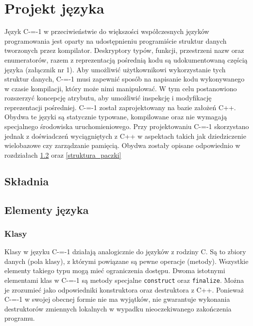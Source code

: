 \section{Projekt języka}
\label{Language_desig}
Język C-=-1 w przeciwieństwie do większości współczesnych języków programowania jest oparty na udostępnieniu programiście struktur danych tworzonych przez kompilator. Deskryptory typów, funkcji, przestrzeni nazw oraz enumeratorów, razem z reprezentacją pośrednią kodu są udokumentowaną częścią języka (załącznik nr 1).
Aby umożliwić użytkownikowi wykorzystanie tych struktur danych, C-=-1 musi zapewnić sposób na napisanie kodu wykonywanego w czasie kompilacji, który może nimi manipulować. W tym celu postanowiono rozszerzyć koncepcję atrybutu, aby umożliwić inspekcję i modyfikację reprezentacji pośredniej.
C-=-1 został zaprojektowany na bazie założeń C++. Obydwa te języki są statycznie typowane, kompilowane oraz nie wymagają specjalnego środowiska uruchomieniowego.
Przy projektowaniu C-=-1 skorzystano jednak z doświadczeń wyciągniętych z C++ w aspektach takich jak dziedziczenie wielobazowe czy zarządzanie pamięcią. Obydwa zostały opisane odpowiednio w rozdziałach \ref{elementy_jezyka} oraz \ref{struktura_paczki}

\subsection{Składnia}

\subsection{Elementy języka}
\label{elementy_jezyka}

\subsubsection{Klasy}
\label{classes_definition}
Klasy w języku C-=-1 działają analogicznie do języków z rodziny C.
Są to zbiory danych (pola klasy), z którymi powiązane są pewne operacje (metody).
Wszystkie elementy takiego typu mogą mieć ograniczenia dostępu.
Dwoma istotnymi elementami klas w C-=-1 są metody specjalne \lstinline{construct} oraz \lstinline{finalize}.
Można je zrozumieć jako odpowiedniki konstruktora oraz destruktora z C++.
Ponieważ C-=-1 w swojej obecnej formie nie ma wyjątków, nie gwarantuje wykonania destruktorów zmiennych lokalnych w wypadku nieoczekiwanego zakończenia programu.

